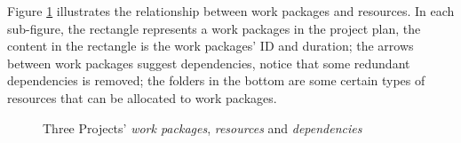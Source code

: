 Figure \ref{fig:dag} illustrates the relationship between work packages and
resources. In each sub-figure, the rectangle represents a work packages in the
project plan, the content in the rectangle is the work packages' ID and
duration; the arrows between work packages suggest dependencies, notice that
some redundant dependencies is removed; the folders in the bottom are some
certain types of resources that can be allocated to work packages. 

\begin{figure}[!ht]
  \centering
  \caption{Three Projects' \emph{work packages}, \emph{resources} and \emph{dependencies}}
  \label{fig:dag}
\end{figure}


